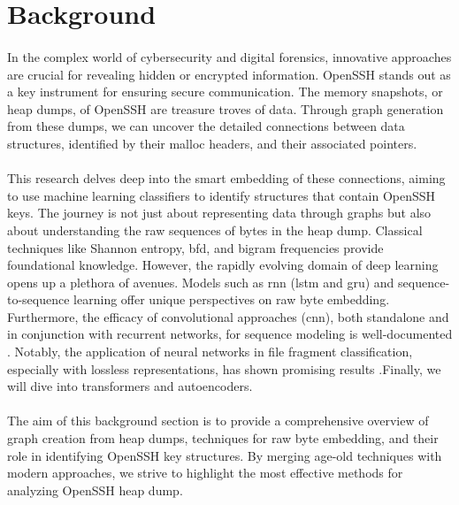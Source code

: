 \section{Background}\label{chap:background}


\paragraph*{}In the complex world of cybersecurity and digital forensics, innovative approaches are crucial for revealing hidden or encrypted information. OpenSSH stands out as a key instrument for ensuring secure communication. The memory snapshots, or heap dumps, of OpenSSH are treasure troves of data. Through graph generation from these dumps, we can uncover the detailed connections between data structures, identified by their malloc headers, and their associated pointers.

\paragraph*{}This research delves deep into the smart embedding of these connections, aiming to use machine learning classifiers to identify structures that contain OpenSSH keys. The journey is not just about representing data through graphs but also about understanding the raw sequences of bytes in the heap dump. Classical techniques like Shannon entropy, \acrfull{bfd}, and bigram frequencies provide foundational knowledge. However, the rapidly evolving domain of deep learning opens up a plethora of avenues. Models such as \acrfull{rnn} \cite{lai_recurrent_2015} (\acrfull{lstm}\cite{hochreiter_long_1997} and \acrfull{gru}\cite{chung_empirical_2014}) and sequence-to-sequence learning \cite{sutskever_sequence_2014} offer unique perspectives on raw byte embedding. Furthermore, the efficacy of convolutional approaches (\acrshort{cnn}), both standalone\cite{lecun_gradient-based_1998} and in conjunction with recurrent networks, for sequence modeling is well-documented \cite{bai_empirical_2018}. Notably, the application of neural networks in file fragment classification, especially with lossless representations, has shown promising results \cite{hiester_file_2018}.Finally, we will dive into transformers\cite{vaswani_attention_2017} and autoencoders.

\paragraph*{}The aim of this background section is to provide a comprehensive overview of graph creation from heap dumps, techniques for raw byte embedding, and their role in identifying OpenSSH key structures. By merging age-old techniques with modern approaches, we strive to highlight the most effective methods for analyzing OpenSSH heap dump.

